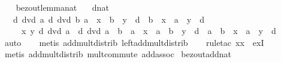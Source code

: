\begin{isabellebody}
\isanewline
\ \ \isamarkupfalse%
\isanewline
{}\isamarkupfalse%
%
\endisatagproof
{\isafoldproof}%
%
\isadelimproof
\isanewline
%
\endisadelimproof
\isanewline
{}\isamarkupfalse%
\ bezout{\isacharunderscore}{\kern0pt}lemma{\isacharunderscore}{\kern0pt}nat{\isacharcolon}{\kern0pt}\isanewline
\ \ \ d{\isacharcolon}{\kern0pt}{\isacharcolon}{\kern0pt}nat\isanewline
\ \ \ {\isachardoublequoteopen}{\isasymlbrakk}d\ dvd\ a{\isacharsemicolon}{\kern0pt}\ d\ dvd\ b{\isacharsemicolon}{\kern0pt}\ a\ {\isacharasterisk}{\kern0pt}\ x\ {\isacharequal}{\kern0pt}\ b\ {\isacharasterisk}{\kern0pt}\ y\ {\isacharplus}{\kern0pt}\ d\ {\isasymor}\ b\ {\isacharasterisk}{\kern0pt}\ x\ {\isacharequal}{\kern0pt}\ a\ {\isacharasterisk}{\kern0pt}\ y\ {\isacharplus}{\kern0pt}\ d{\isasymrbrakk}\isanewline
\ \ \ \ {\isasymLongrightarrow}\ {\isasymexists}x\ y{\isachardot}{\kern0pt}\ d\ dvd\ a\ {\isasymand}\ d\ dvd\ a\ {\isacharplus}{\kern0pt}\ b\ {\isasymand}\ {\isacharparenleft}{\kern0pt}a\ {\isacharasterisk}{\kern0pt}\ x\ {\isacharequal}{\kern0pt}\ {\isacharparenleft}{\kern0pt}a\ {\isacharplus}{\kern0pt}\ b{\isacharparenright}{\kern0pt}\ {\isacharasterisk}{\kern0pt}\ y\ {\isacharplus}{\kern0pt}\ d\ {\isasymor}\ {\isacharparenleft}{\kern0pt}a\ {\isacharplus}{\kern0pt}\ b{\isacharparenright}{\kern0pt}\ {\isacharasterisk}{\kern0pt}\ x\ {\isacharequal}{\kern0pt}\ a\ {\isacharasterisk}{\kern0pt}\ y\ {\isacharplus}{\kern0pt}\ d{\isacharparenright}{\kern0pt}{\isachardoublequoteclose}\isanewline
%
\isadelimproof
\ \ %
\endisadelimproof
%
\isatagproof
{}\isamarkupfalse%
\ auto\isanewline
\ \ \isamarkupfalse%
\ {\isacharparenleft}{\kern0pt}metis\ add{\isacharunderscore}{\kern0pt}mult{\isacharunderscore}{\kern0pt}distrib{}\ left{\isacharunderscore}{\kern0pt}add{\isacharunderscore}{\kern0pt}mult{\isacharunderscore}{\kern0pt}distrib{\isacharparenright}{\kern0pt}\isanewline
\ \ \isamarkupfalse%
\ {\isacharparenleft}{\kern0pt}rule{\isacharunderscore}{\kern0pt}tac\ x{\isacharequal}{\kern0pt}x\ \ exI{\isacharparenright}{\kern0pt}\isanewline
\ \ \isamarkupfalse%
\ {\isacharparenleft}{\kern0pt}metis\ add{\isacharunderscore}{\kern0pt}mult{\isacharunderscore}{\kern0pt}distrib{}\ mult{\isachardot}{\kern0pt}commute\ add{\isachardot}{\kern0pt}assoc{\isacharparenright}{\kern0pt}%
\endisatagproof
{\isafoldproof}%
%
\isadelimproof
\isanewline
%
\endisadelimproof
\isanewline
{}\isamarkupfalse%
\ bezout{\isacharunderscore}{\kern0pt}add{\isacharunderscore}{\kern0pt}nat{\isacharcolon}{\kern0pt}\ \isanewline

\end{isabellebody}
